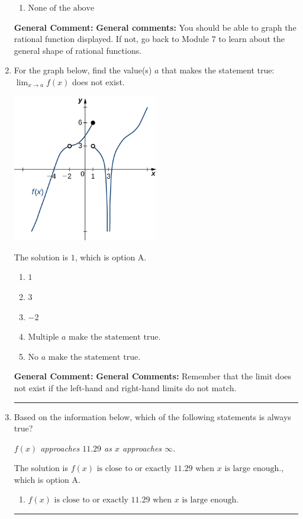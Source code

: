 \documentclass{extbook}[14pt]
\newcommand{\litem}[1]{\item #1

\rule{\textwidth}{0.4pt}}
\begin{document}
\begin{enumerate}
{\begin{enumerate}[label=\Alph*.]
\item \( \text{None of the above} \)


\end{enumerate}

\textbf{General Comment:} \textbf{General comments:} You should be able to graph the rational function displayed. If not, go back to Module 7 to learn about the general shape of rational functions.
}
\litem{
For the graph below, find the value(s) $a$ that makes the statement true: $ \displaystyle \lim_{x \rightarrow a} f(x)$ does not exist.

\begin{center}
    \includegraphics[width=0.5\textwidth]{../Figures/evaluateLimitGraphicallyCopyA.png}
\end{center}


The solution is \( 1 \), which is option A.\begin{enumerate}[label=\Alph*.]
\item \( 1 \)


\item \( 3 \)


\item \( -2 \)


\item \( \text{Multiple } a \text{ make the statement true}. \)


\item \( \text{No } a \text{ make the statement true}. \)


\end{enumerate}

\textbf{General Comment:} \textbf{General Comments:} Remember that the limit does not exist if the left-hand and right-hand limits do not match.
}
\litem{
Based on the information below, which of the following statements is always true?

\begin{center}
    \textit{ $f(x)$ approaches $11.29$ as $x$ approaches $\infty$. }
\end{center}
The solution is \( f(x) \text{ is close to or exactly } 11.29 \text{ when } x \text{ is large enough}. \), which is option A.\begin{enumerate}[label=\Alph*.]
\item \( f(x) \text{ is close to or exactly } 11.29 \text{ when } x \text{ is large enough}. \)



\end{enumerate}}
\end{enumerate}
\end{document}
